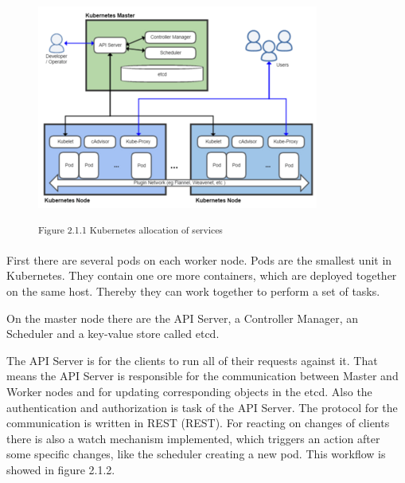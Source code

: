 \begin{figure}[h]
\centering
\includegraphics[width=\textwidth/5*3]{images/kubernetes_service_allocation.png}

\textsuperscript{Figure 2.1.1 Kubernetes allocation of services}
\end{figure}

First there are several pods on each worker node. Pods are the smallest unit in Kubernetes. They contain one ore more containers, which are deployed together on the same host. Thereby they can work together to perform a set of tasks.%

On the master node there are the API Server, a Controller Manager, an Scheduler and a key-value store called etcd.

The API Server is for the clients to run all of their requests against it. That means the API Server is responsible for the communication between Master and Worker nodes and for updating corresponding objects in the etcd. Also the authentication and authorization is task of the API Server. The protocol for the communication is written in \acs{REST} (\acl{REST}). For reacting on changes of clients there is also a watch mechanism implemented, which triggers an action after some specific changes, like the scheduler creating a new pod. This workflow is showed in figure 2.1.2.

